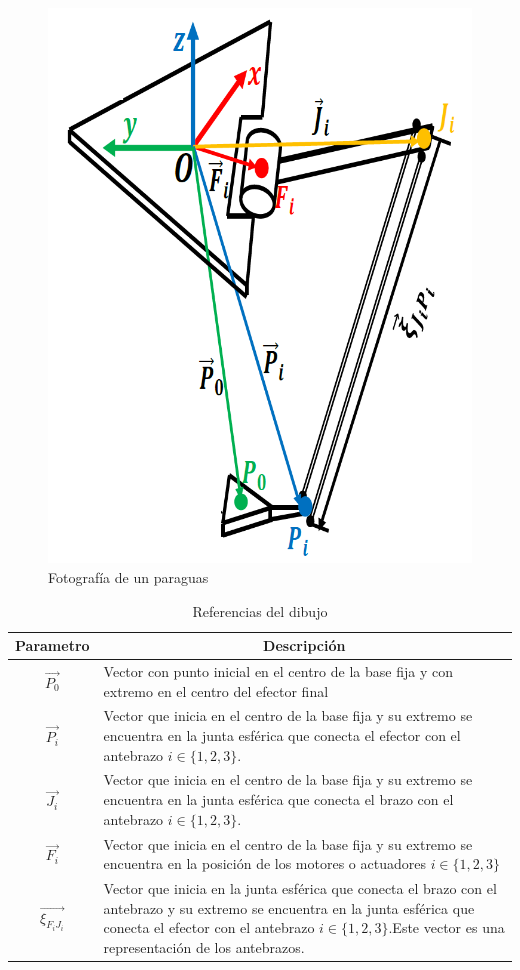             \begin{figure}[htb]
                 \centering
                 \includegraphics[width=0.55\linewidth]{Main/Chapter4/Images4/DIBUJO26.png}
                  \caption{Fotografía de un paraguas}
                  \label{f:Cap4_Metodo_B_Modelacion_Cinematica_Posicion_33}
            \end{figure} 
    
            \begingroup
            \renewcommand{\arraystretch}{1.5}
            \begin{table}[H]
            \centering
            \begin{tabular}{c m{12cm}}
               \hline
               \textbf{Parametro}  & \multicolumn{1}{c}{\textbf{Descripción}}  \\
               \hline           \hline            
             $\overrightarrow{{P}_{0}}$ & Vector con punto inicial en el centro de la base fija y con extremo en el centro del efector final \\
            \hline
             $\overrightarrow{{P}_{i}}$ & Vector que inicia en el centro de la base fija y su extremo se encuentra en la junta esférica que conecta el efector con el antebrazo $i\in\{1,2,3\}$. \\
            \hline
             $\overrightarrow{{J}_{i}}$ & Vector que inicia en el centro de la base fija y su extremo se encuentra en la junta esférica que conecta el brazo con el antebrazo $i\in\{1,2,3\}$. \\
            \hline
             $\overrightarrow{{F}_{i}}$ & Vector que inicia en el centro de la base fija y su extremo se encuentra en la posición de los motores o actuadores $i\in\{1,2,3\}$ \\
            \hline
             $\overrightarrow{{\xi}_{F_iJ_i}}$ & Vector que inicia en la junta esférica que conecta el brazo con el antebrazo y su extremo se encuentra en la junta esférica que conecta el efector con el antebrazo $i\in\{1,2,3\}$.Este vector es una representación de los antebrazos.
 \\
            \hline
            \hline            
            \end{tabular}
            \caption{Referencias del dibujo}
           \label{tab:cap4_tabla_1332}
        \end{table}
        \endgroup     
        
